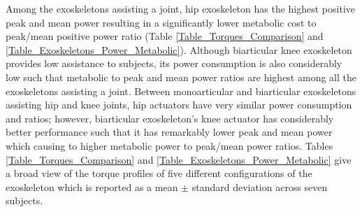 \documentclass[10pt,letterpaper]{article}
\begin{document}
Among the exoskeletons assisting a joint, hip exoskeleton has the highest positive peak and mean power resulting in a significantly lower metabolic cost to peak/mean positive power ratio (Table \ref{Table_Torques_Comparison} and \ref{Table_Exoskeletons_Power_Metabolic}). Although biarticular knee exoskeleton provides low assistance to subjects, its power consumption is also considerably low such that metabolic to peak and mean power ratios are highest among all the exoskeletons assisting a joint.
Between monoarticular and biarticular exoskeletons assisting hip and knee joints, hip actuators have very similar power consumption and ratios; however, biarticular exoskeleton's knee actuator has considerably better performance such that it has remarkably lower peak and mean power which causing to higher metabolic power to peak/mean power ratios.
Tables \ref{Table_Torques_Comparison} and \ref{Table_Exoskeletons_Power_Metabolic} give a broad view of the torque profiles of five different configurations of the exoskeleton which is reported as a mean $\pm$ standard deviation across seven subjects.\\
\end{document}
